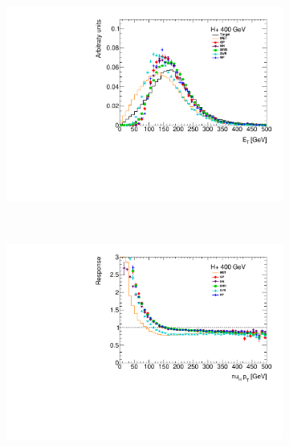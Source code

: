 \documentclass[twocolumn]{scrartcl}
\begin{document}
\begin{figure}[htpb]
    \centering
    \begin{subfigure}{.48\textwidth}
        \includegraphics[width=\textwidth]{plots/pt_400.pdf}
    \end{subfigure}
    ~
    \begin{subfigure}{.48\textwidth}
        \includegraphics[width=\textwidth]{plots/profile_400.pdf}
    \end{subfigure}


\end{figure}
\end{document}

